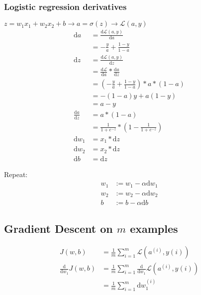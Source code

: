 \subsubsection{Logistic regression derivatives}
$z = w_1 x_1 + w_2 x_2 + b \rightarrow a = \sigma(z) \rightarrow \mathcal L (a, y)$
\begin{align}
	\mathrm{d} a &= \frac{\mathrm{d} \mathcal{L}(a, y)} {\mathrm{d} a} \\
					&= -\frac{y}{a} + \frac{1 - y}{1 - a} \\
	\mathrm{d} z &= \frac{\mathrm{d} \mathcal{L}(a, y)} {\mathrm{d} z} \\
			      &= \frac{\mathrm{d} \mathcal{L}} {\mathrm{d} a} * \frac{\mathrm{d} a} {\mathrm{d} z} \\
					&= (-\frac{y}{a} + \frac{1 - y}{1 - a}) * a * (1 - a) \\
				   &= -(1-a)y + a(1-y) \\
                &= a - y \\
	\frac{\mathrm{d} a} {\mathrm{d} z} &= a * (1 - a) \\
		&= \frac{1}{1 + e^{-z}} * (1 - \frac{1}{1 + e^{-z}}) \\
	\mathrm{d} w_1 &= x_1 * \mathrm{d} z \\
	\mathrm{d} w_2 &= x_2 * \mathrm{d} z \\
	\mathrm{d} b &= \mathrm{d} z
\end{align}


Repeat:
\begin{align}
	w_1 &:= w_1 - \alpha \mathrm{d} w_1 \\
	w_2 &:= w_2 - \alpha \mathrm{d} w_2 \\
	  b &:= b - \alpha \mathrm{d} b
\end{align}


\subsection{Gradient Descent on $m$ examples}
\begin{align}
	J(w, b) &= \frac{1}{m} \sum_{i = 1}^{m} \mathcal{L}(a^{(i)}, y{(i)}) \\
	\frac{\mathrm{d}} {\mathrm{d}w_1} J(w, b) &= \frac{1}{m} \sum_{i = 1}^{m} 
		\frac{\mathrm{d}} {\mathrm{d}w_1} \mathcal{L}(a^{(i)}, y{(i)}) \\
	&= \frac{1}{m} \sum_{i = 1}^{m} \mathrm{d}w_1^{(i)}
\end{align}


